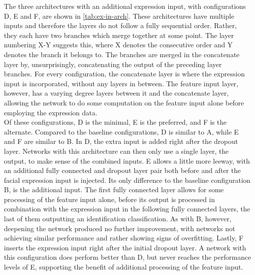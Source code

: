 The three architectures with an additional expression input, with configurations D, E and F, are shown in \autoref{tab:ex-in-arch}. These architectures have multiple inputs and therefore the layers do not follow a fully sequential order. Rather, they each have two branches which merge together at some point. The layer numbering X-Y suggests this, where X denotes the consecutive order and Y denotes the branch it belongs to. The branches are merged in the concatenate layer by, unsurprisingly, concatenating the output of the preceding layer branches. For every configuration, the concatenate layer is where the expression input is incorporated, without any layers in between. The feature input layer, however, has a varying degree layers between it and the concatenate layer, allowing the network to do some computation on the feature input alone before employing the expression data. \\

\noindent Of these configurations, D is the minimal, E is the preferred, and F is the alternate. Compared to the baseline configurations, D is similar to A, while E and F are similar to B. In D, the extra input is added right after the dropout layer. Networks with this architecture can then only use a single layer, the output, to make sense of the combined inputs. E allows a little more leeway, with an additional fully connected and dropout layer pair both before and after the facial expression input is injected. Its only difference to the baseline configuration B, is the additional input. The first fully connected layer allows for some processing of the feature input alone, before its output is processed in combination with the expression input in the following fully connected layers, the last of them outputting an identification classification. As with B, however, deepening the network produced no further improvement, with networks not achieving similar performance and rather showing signs of overfitting. Lastly, F inserts the expression input right after the initial dropout layer. A network with this configuration does perform better than D, but never reaches the performance levels of E, supporting the benefit of additional processing of the feature input. 

